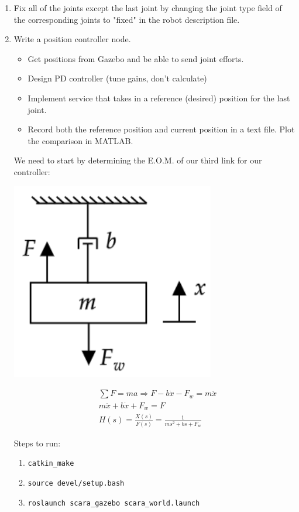 \documentclass[10pt]{article}
\begin{document}
\begin{enumerate}
	\item Fix all of the joints except the last joint by changing the joint type field of the corresponding joints to "fixed" in the robot description file.
	
	\item Write a position controller node.
	
	\begin{itemize}
		\item Get positions from Gazebo and be able to send joint efforts.
		
		\item Design PD controller (tune gains, don't calculate)
		
		\item Implement service that takes in a reference (desired) position for the last joint.
		
		\item Record both the reference position and current position in a text file. Plot the comparison in MATLAB.
		
	\end{itemize}

	We need to start by determining the E.O.M. of our third link for our controller:
	
	\begin{minipage}[h]{0.3\textwidth}
		\centering
		\includegraphics[width=0.7\textwidth]{figures/mass_damper.png}
	\end{minipage}
	\begin{minipage}[h]{0.5\textwidth}
		\begin{align*}
			&\sum{F} = m a \Rightarrow F - b \dot{x} - F_w = m \ddot{x} \\
			&m \ddot{x} + b \dot{x} + F_w = F \\
			&H(s) = \frac{X(s)}{F(s)} = \frac{1}{m s^2 + b s + F_w}
		\end{align*}
	\end{minipage}

	Steps to run:
	
	\begin{enumerate}
		\item \texttt{catkin\_make}
		\item \texttt{source devel/setup.bash}
		\item \texttt{roslaunch scara\_gazebo scara\_world.launch}
		
	\end{enumerate}

\end{enumerate}
\end{document}
